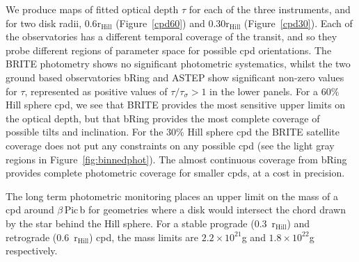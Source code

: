 \documentclass[longauth]{aa} %
\newcommand{\rhill}{$\mathrm{r_{Hill}}$} %
\newcommand{\bpb}{$\beta$\,Pic\,b}
\begin{document}
We produce maps of fitted optical depth $\tau$ for each of the three instruments, and for two disk radii, 0.6\rhill{} (Figure~\ref{cpd60}) and 0.30\rhill{} (Figure~\ref{cpd30}).
%
Each of the observatories has a different temporal coverage of the transit, and so they probe different regions of parameter space for possible \ac{cpd} orientations.
%
The BRITE photometry shows no significant photometric systematics, whilst the two ground based observatories bRing and ASTEP show significant non-zero values for $\tau$, represented as positive values of $\tau / \tau_\sigma > 1$ in the lower panels. 
%
For a 60\% Hill sphere \ac{cpd}, we see that BRITE provides the most sensitive upper limits on the optical depth, but that bRing provides the most complete coverage of possible tilts and inclination.
%
For the 30\% Hill sphere \ac{cpd} the BRITE satellite coverage does not put any constraints on any possible \ac{cpd} (see the light gray regions in Figure~\ref{fig:binnedphot}).
%
The almost continuous coverage from bRing provides complete photometric coverage for smaller \ac{cpd}s, at a cost in precision.

The long term photometric monitoring places an upper limit on the mass of a \ac{cpd} around \bpb{} for geometries where a disk would intersect the chord drawn by the star behind the Hill sphere.
%
For a stable prograde (0.3\ \rhill{}) and retrograde (0.6\ \rhill{}) \ac{cpd}, the mass limits are $2.2\times 10^{21}$g and $1.8\times 10^{22}$g respectively. 
%
\end{document}
